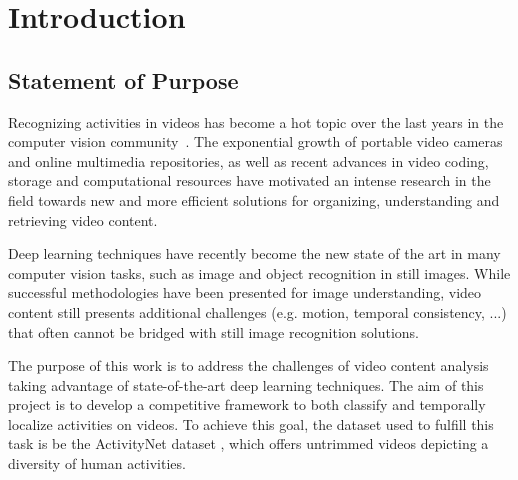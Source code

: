 \chapter{Introduction}

\section{Statement of Purpose}

Recognizing activities in videos has become a hot topic over the last years in the computer vision community~\cite{ngiam2011multimodal}. The exponential growth of portable video cameras and online multimedia repositories, as well as recent advances in video coding, storage and computational resources have motivated an intense research in the field towards new and more efficient solutions for organizing, understanding and retrieving video content.

Deep learning techniques have recently become the new state of the art in many computer vision tasks, such as image and object recognition in still images. While successful methodologies have been presented for image understanding, video content still presents additional challenges (e.g. motion, temporal consistency, ...)  that often cannot be bridged with still image recognition solutions.  

The purpose of this work is to address the challenges of video content analysis taking advantage of state-of-the-art deep learning techniques. The aim of this project is to develop a competitive framework to both classify and temporally localize activities on videos. To achieve this goal, the dataset used to fulfill this task is be the ActivityNet dataset \cite{caba2015activitynet}, which offers untrimmed videos depicting a diversity of human activities.




